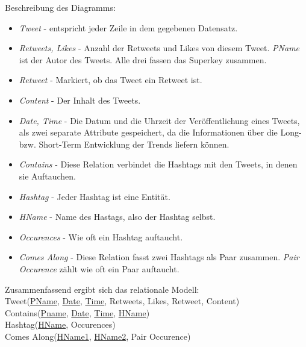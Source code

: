 \documentclass[paper=a4, english, ngerman, romanian]{scrartcl}
\begin{document}
	Beschreibung des Diagramms:
	
	\begin{itemize}
	\item \textit{Tweet} - entspricht jeder Zeile in dem gegebenen Datensatz.
	\item \textit{Retweets, Likes} - Anzahl der Retweets und Likes von diesem Tweet. \textit{PName} ist der Autor des Tweets. Alle drei fassen das Superkey zusammen.
	\item \textit{Retweet} - Markiert, ob das Tweet ein Retweet ist.
	\item \textit{Content} - Der Inhalt des Tweets.
	\item \textit{Date, Time} - Die Datum und die Uhrzeit der Veröffentlichung eines Tweets, als zwei separate Attribute gespeichert, da die Informationen über die Long- bzw. Short-Term Entwicklung der Trends liefern können.
	\item \textit{Contains} - Diese Relation verbindet die Hashtags mit den Tweets, in denen sie Auftauchen.
	\item \textit{Hashtag} - Jeder Hashtag ist eine Entität.
	\item \textit{HName} - Name des Hastags, also der Hashtag selbst.
	\item \textit{Occurences} - Wie oft ein Hashtag auftaucht.
	\item \textit{Comes Along} - Diese Relation fasst zwei Hashtags als Paar zusammen. \textit{Pair Occurence} zählt wie oft ein Paar auftaucht.
	\end{itemize}

	Zusammenfassend ergibt sich das relationale Modell: \\

	Tweet(\underline{PName}, \underline{Date}, \underline{Time}, Retweets, Likes, Retweet, Content)\\
	Contains(\underline{Pname}, \underline{Date}, \underline{Time}, \underline{HName})\\
	Hashtag(\underline{HName}, Occurences)\\
	Comes Along(\underline{HName1}, \underline{HName2}, Pair Occurence)   

	
\end{document}
